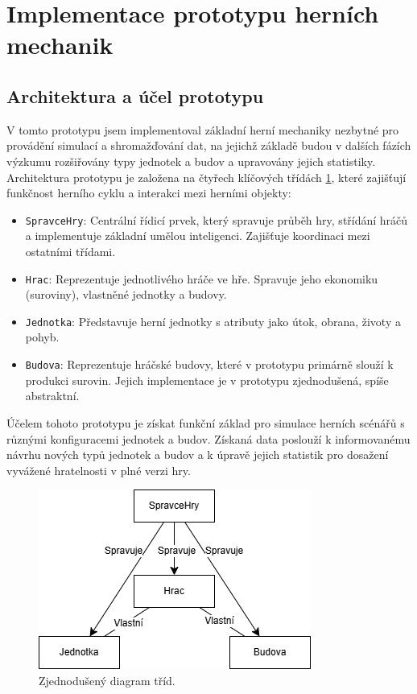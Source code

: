 \section{Implementace prototypu herních mechanik}

\subsection{Architektura a účel prototypu}

V tomto prototypu jsem implementoval základní herní mechaniky nezbytné pro provádění simulací a shromažďování dat, na jejichž základě budou v dalších fázích výzkumu rozšiřovány typy jednotek a budov a upravovány jejich statistiky. Architektura prototypu je založena na čtyřech klíčových třídách \ref{diagram_trid}, které zajišťují funkčnost herního cyklu a interakci mezi herními objekty:

\begin{itemize}
    \item \texttt{SpravceHry}: Centrální řídicí prvek, který spravuje průběh hry, střídání hráčů a implementuje základní umělou inteligenci. Zajišťuje koordinaci mezi ostatními třídami.
    \item \texttt{Hrac}: Reprezentuje jednotlivého hráče ve hře. Spravuje jeho ekonomiku (suroviny), vlastněné jednotky a budovy.
    \item \texttt{Jednotka}: Představuje herní jednotky s atributy jako útok, obrana, životy a pohyb.
    \item \texttt{Budova}: Reprezentuje hráčské budovy, které v prototypu primárně slouží k produkci surovin. Jejich implementace je v prototypu zjednodušená, spíše abstraktní.
\end{itemize}

Účelem tohoto prototypu je získat funkční základ pro simulace herních scénářů s různými konfiguracemi jednotek a budov. Získaná data poslouží k informovanému návrhu nových typů jednotek a budov a k úpravě jejich statistik pro dosažení vyvážené hratelnosti v plné verzi hry.

\begin{figure}
  \centering      %
  \includegraphics[scale=0.8]{obr/tridy.png} %
  \caption{Zjednodušený diagram tříd.} %
  \label{diagram_trid} %
\end{figure}

